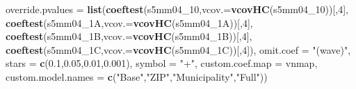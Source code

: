 \documentclass[
]{article}
\newenvironment{Shaded}{\begin{snugshade}}{\end{snugshade}}
\newcommand{\DataTypeTok}[1]{\textcolor[rgb]{0.13,0.29,0.53}{#1}}
\newcommand{\DecValTok}[1]{\textcolor[rgb]{0.00,0.00,0.81}{#1}}
\newcommand{\FloatTok}[1]{\textcolor[rgb]{0.00,0.00,0.81}{#1}}
\newcommand{\KeywordTok}[1]{\textcolor[rgb]{0.13,0.29,0.53}{\textbf{#1}}}
\newcommand{\NormalTok}[1]{#1}
\newcommand{\StringTok}[1]{\textcolor[rgb]{0.31,0.60,0.02}{#1}}
\begin{document}
\begin{Shaded}
\begin{Highlighting}[]
          \DataTypeTok{override.pvalues =} \KeywordTok{list}\NormalTok{(}\KeywordTok{coeftest}\NormalTok{(s5mm04_}\DecValTok{10}\NormalTok{,}\DataTypeTok{vcov.=}\KeywordTok{vcovHC}\NormalTok{(s5mm04_}\DecValTok{10}\NormalTok{))[,}\DecValTok{4}\NormalTok{],}
                                  \KeywordTok{coeftest}\NormalTok{(s5mm04_1A,}\DataTypeTok{vcov.=}\KeywordTok{vcovHC}\NormalTok{(s5mm04_1A))[,}\DecValTok{4}\NormalTok{],}
                                  \KeywordTok{coeftest}\NormalTok{(s5mm04_1B,}\DataTypeTok{vcov.=}\KeywordTok{vcovHC}\NormalTok{(s5mm04_1B))[,}\DecValTok{4}\NormalTok{],}
                                  \KeywordTok{coeftest}\NormalTok{(s5mm04_1C,}\DataTypeTok{vcov.=}\KeywordTok{vcovHC}\NormalTok{(s5mm04_1C))[,}\DecValTok{4}\NormalTok{]),}
          \DataTypeTok{omit.coef =} \StringTok{"(wave)"}\NormalTok{, }\DataTypeTok{stars =} \KeywordTok{c}\NormalTok{(}\FloatTok{0.1}\NormalTok{,}\FloatTok{0.05}\NormalTok{,}\FloatTok{0.01}\NormalTok{,}\FloatTok{0.001}\NormalTok{), }\DataTypeTok{symbol =} \StringTok{"+"}\NormalTok{,}
          \DataTypeTok{custom.coef.map =}\NormalTok{ vnmap, }
          \DataTypeTok{custom.model.names =} \KeywordTok{c}\NormalTok{(}\StringTok{"Base"}\NormalTok{,}\StringTok{"ZIP"}\NormalTok{,}\StringTok{"Municipality"}\NormalTok{,}\StringTok{"Full"}\NormalTok{))}
\end{Highlighting}
\end{Shaded}
\end{document}
